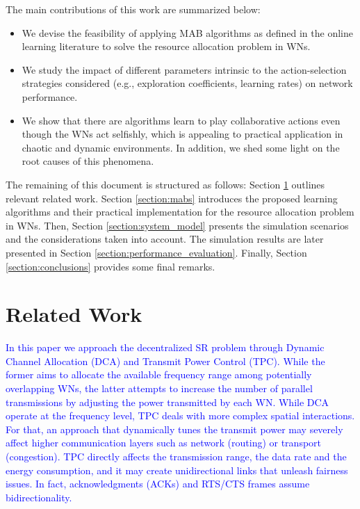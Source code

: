 \documentclass[10pt,journal,compsoc]{IEEEtran}
\newcommand{\francesc}[1]{\textcolor{blue}{#1}}
\begin{document}
	The main contributions of this work are summarized below:
	\begin{itemize}		
		\item We devise the feasibility of applying MAB algorithms as defined in the online learning literature to solve the resource allocation problem in WNs.
		\item We study the impact of different parameters intrinsic to the action-selection strategies considered (e.g., exploration coefficients, learning rates) on network performance.
		\item We show that there are algorithms learn to play collaborative actions even though the WNs act selfishly, which is appealing to practical application in chaotic and dynamic environments. In addition, we shed some light on the root causes of this phenomena. 
	\end{itemize}
	
	
	The remaining of this document is structured as follows: Section \ref{section:related_work} outlines relevant related work. Section \ref{section:mabs} introduces the proposed learning algorithms and their practical implementation for the resource allocation problem in WNs. Then, Section \ref{section:system_model} presents the simulation scenarios and the considerations taken into account. The simulation results are later presented in Section \ref{section:performance_evaluation}. Finally, Section \ref{section:conclusions} provides some final remarks.
	
	\section{Related Work}
	\label{section:related_work}	
	\francesc{In this paper we approach the decentralized SR problem through Dynamic Channel Allocation (DCA) and Transmit Power Control (TPC). While the former aims to allocate the available frequency range among potentially overlapping WNs, the latter attempts to increase the number of parallel transmissions by adjusting the power transmitted by each WN. While DCA operate at the frequency level, TPC deals with more complex spatial interactions. For that, an approach that dynamically tunes the transmit power may severely affect higher communication layers such as network (routing) or transport (congestion). TPC directly affects the transmission range, the data rate and the energy consumption, and it may create unidirectional links that unleash fairness issues. In fact, acknowledgments (ACKs) and RTS/CTS frames assume bidirectionality.} 
	
\end{document}
